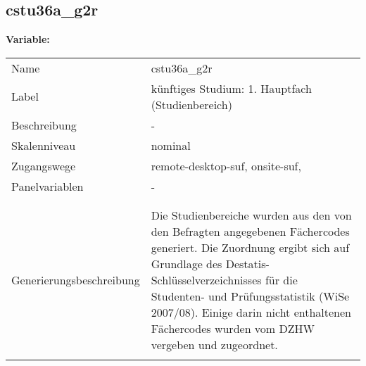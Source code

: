 	
	
	\subsection{cstu36a\_g2r}
	\label{subSection:cstu36a_g2r}

	\noindent\textbf{Variable:}\\
		\begin{tabular}{lL{11.3cm}}
			\label{tableVariable:cstu36a_g2r}
			Name & cstu36a\_g2r \\
			Label & künftiges Studium: 1. Hauptfach (Studienbereich) \\
			Beschreibung & - \\
			Skalenniveau & nominal \\
			Zugangswege &
				remote-desktop-suf,
				onsite-suf,
 \\
			Panelvariablen & -
			 \\
			 \\
 \\
					Generierungsbeschreibung & Die Studienbereiche wurden aus den von den Befragten angegebenen Fächercodes generiert. Die Zuordnung ergibt sich auf Grundlage des Destatis-Schlüsselverzeichnisses für die Studenten- und Prüfungsstatistik (WiSe 2007/08). Einige darin nicht enthaltenen Fächercodes wurden vom DZHW vergeben und zugeordnet. 
				 \\	
			 \\
		\end{tabular}






